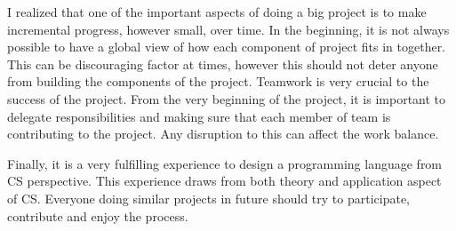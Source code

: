 I realized that one of the important aspects of doing a big project is to make incremental progress, however small, over time. In the beginning, it is not always possible to have a global view of how each component of project fits in together. This can be discouraging factor at times, however this should not deter anyone from building the components of the project. Teamwork is very crucial to the success of the project. From the very beginning of the project, it is important to delegate responsibilities and making sure that each member of team is contributing to the project. Any disruption to this can affect the work balance.

Finally, it is a very fulfilling experience to design a programming language from CS perspective. This experience draws from both theory and application aspect of CS. Everyone doing similar projects in future should try to participate, contribute and enjoy the process.